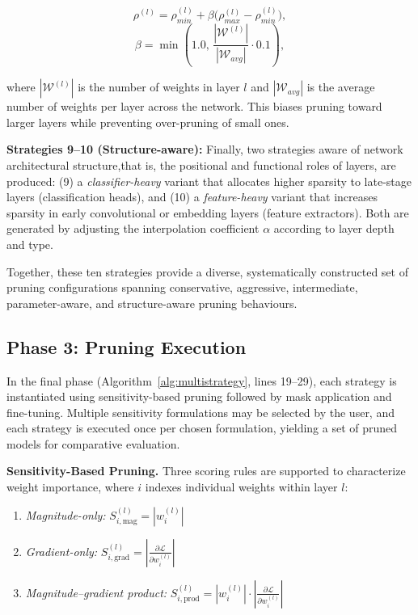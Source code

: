 \documentclass[11pt, conference]{IEEEtran}
\begin{document}
\begin{equation}
\rho^{(l)} = \rho_{min}^{(l)} + \beta\big(\rho_{max}^{(l)} - \rho_{min}^{(l)}\big),
\end{equation}
\begin{equation}
\beta = \min\left(1.0,\, \frac{|\mathcal{W}^{(l)}|}{|\mathcal{W}_{avg}|} \cdot 0.1\right),
\end{equation}

where $|\mathcal{W}^{(l)}|$ is the number of weights in layer $l$ and $|\mathcal{W}_{avg}|$ is the average number of weights per layer across the network. This biases pruning toward larger layers while preventing over-pruning of small ones.

\textbf{Strategies 9--10 (Structure-aware):} Finally, two strategies aware of network architectural structure,that is, the positional and functional roles of layers, are produced: (9) a \emph{classifier-heavy} variant that allocates higher sparsity to late-stage layers (classification heads), and (10) a \emph{feature-heavy} variant that increases sparsity in early convolutional or embedding layers (feature extractors). Both are generated by adjusting the interpolation coefficient $\alpha$ according to layer depth and type.

Together, these ten strategies provide a diverse, systematically constructed set of pruning configurations spanning conservative, aggressive, intermediate, parameter-aware, and structure-aware pruning behaviours.

\subsection{Phase 3: Pruning Execution}

In the final phase (Algorithm~\ref{alg:multistrategy}, lines 19--29), each strategy is instantiated using sensitivity-based pruning followed by mask application and fine-tuning. Multiple sensitivity formulations may be selected by the user, and each strategy is executed once per chosen formulation, yielding a set of pruned models for comparative evaluation.

\textbf{Sensitivity-Based Pruning.}
Three scoring rules are supported to characterize weight importance, where $i$ indexes individual weights within layer $l$:

\begin{enumerate}
    \item \textit{Magnitude-only:} \quad $S_{i,\text{mag}}^{(l)} = |w_i^{(l)}|$ \cite{han2015learning}
    \item \textit{Gradient-only:} \quad $S_{i,\text{grad}}^{(l)} = \left|\frac{\partial \mathcal{L}}{\partial w_i^{(l)}}\right|$ \cite{lee2018snip}
    \item \textit{Magnitude--gradient product:} \quad $S_{i,\text{prod}}^{(l)} = |w_i^{(l)}| \cdot \left|\frac{\partial \mathcal{L}}{\partial w_i^{(l)}}\right|$ \cite{wang2020picking}
\end{enumerate}
\end{document}
